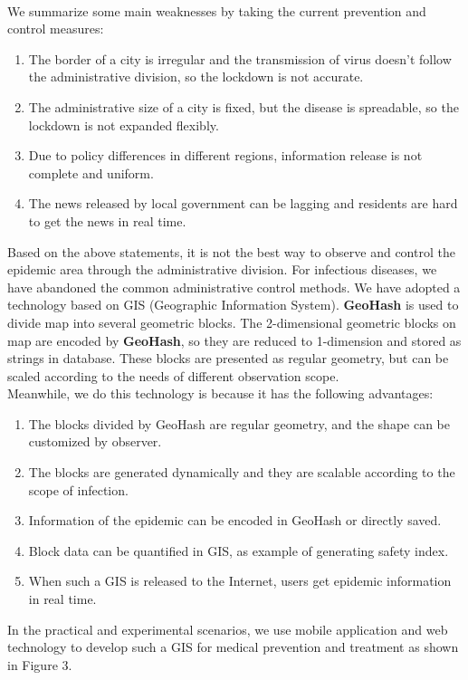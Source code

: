 \documentclass[sigplan,screen]{acmart}
\begin{document}
\\
We summarize some main weaknesses by taking the current prevention and control measures:
\begin{enumerate}
	\item The border of a city is irregular and the transmission of virus doesn't follow the administrative division, so the lockdown is not accurate.
	\item The administrative size of a city is fixed, but the disease is spreadable, so the lockdown is not expanded flexibly.
	\item Due to policy differences in different regions, information release is not complete and uniform.
	\item The news released by local government can be lagging and residents are hard to get the news in real time.
\end{enumerate}
Based on the above statements, it is not the best way to observe and control the epidemic area through the administrative division.
For infectious diseases, we have abandoned the common administrative control methods.
We have adopted a technology based on GIS (Geographic Information System)\cite{clarke1986advances}.
\textbf{GeoHash} is used to divide map into several geometric blocks.
The 2-dimensional geometric blocks on map are encoded by \textbf{GeoHash}, so they are reduced to 1-dimension and stored as strings in database.
These blocks are presented as regular geometry, but can be scaled according to the needs of different observation scope.
\\
Meanwhile, we do this technology is because it has the following advantages:
\begin{enumerate}
	\item The blocks divided by GeoHash are regular geometry, and the shape can be customized by observer.
	\item The blocks are generated dynamically and they are scalable according to the scope of infection.
	\item Information of the epidemic can be encoded in GeoHash or directly saved.
	\item Block data can be quantified in GIS, as example of generating safety index.
	\item When such a GIS is released to the Internet, users get epidemic information in real time.
\end{enumerate}
In the practical and experimental scenarios, we use mobile application and web technology to develop such a GIS for medical prevention and treatment as shown in Figure 3.
\end{document}
